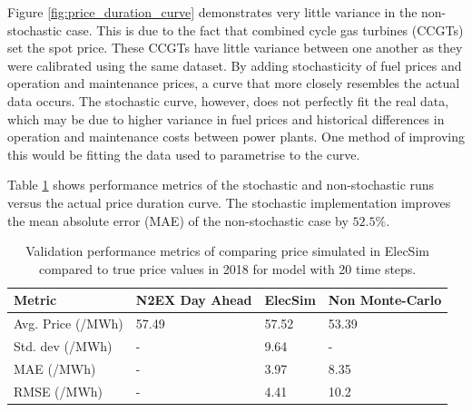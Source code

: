 Figure \ref{fig:price_duration_curve} demonstrates very little variance in the non-stochastic case. This is due to the fact that combined cycle gas turbines (CCGTs) set the spot price. These CCGTs have little variance between one another as they were calibrated using the same dataset. By adding stochasticity of fuel prices and operation and maintenance prices, a curve that more closely resembles the actual data occurs. The stochastic curve, however, does not perfectly fit the real data, which may be due to higher variance in fuel prices and historical differences in operation and maintenance costs between power plants. One method of improving this would be fitting the data used to parametrise to the curve.

Table \ref{table:validation_metrics} shows performance metrics of the stochastic and non-stochastic runs versus the actual price duration curve. The stochastic implementation improves the mean absolute error (MAE) of the non-stochastic case by $52.5\%$.

\begin{table}[]
	\begin{tabular}{p{4cm}p{4cm}p{2.5cm}p{3cm}}
		\hline
		Metric & N2EX Day Ahead & ElecSim & Non Monte-Carlo \\ \hline
		Avg. Price (\textsterling/MWh) & 57.49 & 57.52 & 53.39 \\
		Std. dev (\textsterling/MWh) & - & 9.64 & - \\
		MAE (\textsterling/MWh) & - & 3.97 & 8.35 \\
		RMSE (\textsterling/MWh) & - & 4.41 & 10.2 \\ \hline
	\end{tabular}
	\caption{Validation performance metrics of comparing price simulated in ElecSim compared to true price values in 2018 for model with 20 time steps.}
	\label{table:validation_metrics}
\end{table}






